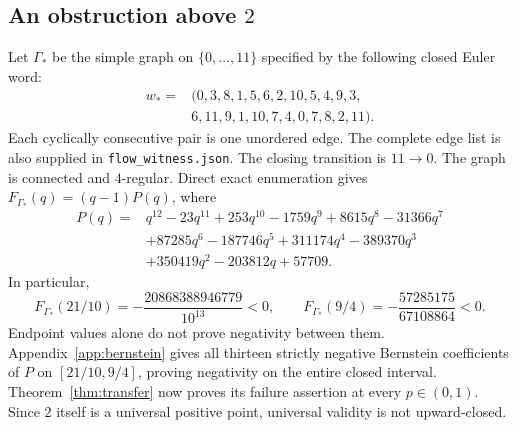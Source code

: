 \documentclass[11pt,a4paper]{article}
\theoremstyle{remark}\newtheorem{remark}[theorem]{Remark}
\begin{document}
\subsection{An obstruction above $2$}\label{sec:above}
Let $\Gamma_*$ be the simple graph on $\{0,\ldots,11\}$ specified by the following closed Euler word:
\begin{equation}\label{eq:wordstar}
\begin{split}
w_*={}&(0,3,8,1,5,6,2,10,5,4,9,3,\\
       &6,11,9,1,10,7,4,0,7,8,2,11).
\end{split}
\end{equation}
Each cyclically consecutive pair is one unordered edge. The complete edge list is also supplied in \texttt{flow\_witness.json}.
The closing transition is $11\to0$. The graph is connected and $4$-regular. Direct exact enumeration gives $F_{\Gamma_*}(q)=(q-1)P(q)$, where
\begin{equation}\label{eq:poly}
\begin{split}
P(q)={}&q^{12}-23q^{11}+253q^{10}-1759q^9+8615q^8-31366q^7\\
 &+87285q^6-187746q^5+311174q^4-389370q^3\\
 &+350419q^2-203812q+57709.
\end{split}
\end{equation}
In particular,
\begin{equation}\label{eq:negativevalue}
F_{\Gamma_*}(21/10)=-\frac{20868388946779}{10^{13}}<0,
\qquad
F_{\Gamma_*}(9/4)=-\frac{57285175}{67108864}<0.
\end{equation}
Endpoint values alone do not prove negativity between them. Appendix~\ref{app:bernstein} gives all thirteen strictly negative Bernstein coefficients of $P$ on $[21/10,9/4]$, proving negativity on the entire closed interval. Theorem~\ref{thm:transfer} now proves its failure assertion at every $p\in(0,1)$. Since $2$ itself is a universal positive point, universal validity is not upward-closed.
\end{document}
